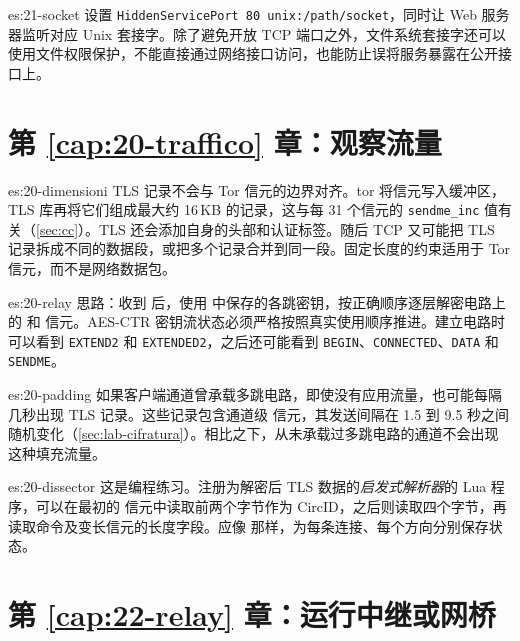 \begin{soluzione}{es:21-socket}
设置 \texttt{HiddenServicePort 80 unix:/path/socket}，同时让 Web 服务器监听对应 Unix 套接字。除了避免开放 TCP 端口之外，文件系统套接字还可以使用文件权限保护，不能直接通过网络接口访问，也能防止误将服务暴露在公开接口上。
\end{soluzione}

\section*{第 \ref{cap:20-traffico} 章：观察流量}

\begin{soluzione}{es:20-dimensioni}
TLS 记录不会与 Tor 信元的边界对齐。tor 将信元写入缓冲区，TLS 库再将它们组成最大约 16\,KB 的记录，这与每 31 个信元的 \texttt{sendme\_inc} 值有关（\cref{sec:cc}）。TLS 还会添加自身的头部和认证标签。随后 TCP 又可能把 TLS 记录拆成不同的数据段，或把多个记录合并到同一段。固定长度的约束适用于 Tor 信元，而不是网络数据包。
\end{soluzione}

\begin{soluzione}{es:20-relay}
思路：收到  后，使用  中保存的各跳密钥，按正确顺序逐层解密电路上的  和  信元。AES-CTR 密钥流状态必须严格按照真实使用顺序推进。建立电路时可以看到 \texttt{EXTEND2} 和 \texttt{EXTENDED2}，之后还可能看到 \texttt{BEGIN}、\texttt{CONNECTED}、\texttt{DATA} 和 \texttt{SENDME}。
\end{soluzione}

\begin{soluzione}{es:20-padding}
如果客户端通道曾承载多跳电路，即使没有应用流量，也可能每隔几秒出现 TLS 记录。这些记录包含通道级  信元，其发送间隔在 1.5 到 9.5 秒之间随机变化（\cref{sec:lab-cifratura}）。相比之下，从未承载过多跳电路的通道不会出现这种填充流量。
\end{soluzione}

\begin{soluzione}{es:20-dissector}
这是编程练习。注册为解密后 TLS 数据的\emph{启发式解析器}的 Lua 程序，可以在最初的  信元中读取前两个字节作为 CircID，之后则读取四个字节，再读取命令及变长信元的长度字段。应像  那样，为每条连接、每个方向分别保存状态。
\end{soluzione}

\section*{第 \ref{cap:22-relay} 章：运行中继或网桥}

